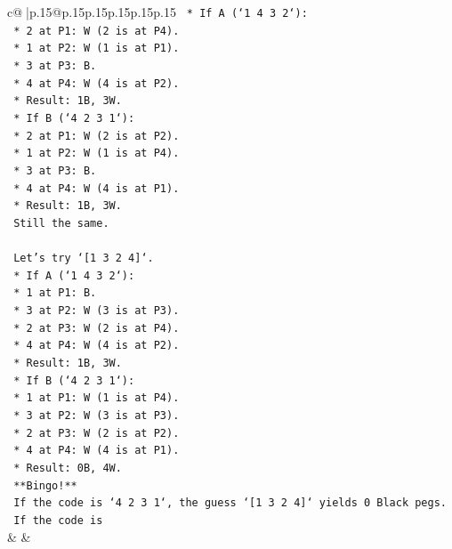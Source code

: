 \documentclass{article}
\begin{document}
{\begin{supertabular}{c@{$\;$}|p{.15\linewidth}@{}p{.15\linewidth}p{.15\linewidth}p{.15\linewidth}p{.15\linewidth}p{.15\linewidth}}
{{{\texttt{    *   If A (`1 4 3 2`):} \\
\texttt{        *   2 at P1: W (2 is at P4).} \\
\texttt{        *   1 at P2: W (1 is at P1).} \\
\texttt{        *   3 at P3: B.} \\
\texttt{        *   4 at P4: W (4 is at P2).} \\
\texttt{        *   Result: 1B, 3W.} \\
\texttt{    *   If B (`4 2 3 1`):} \\
\texttt{        *   2 at P1: W (2 is at P2).} \\
\texttt{        *   1 at P2: W (1 is at P4).} \\
\texttt{        *   3 at P3: B.} \\
\texttt{        *   4 at P4: W (4 is at P1).} \\
\texttt{        *   Result: 1B, 3W.} \\
\texttt{    Still the same.} \\
\\ 
\texttt{    Let's try `{[}1 3 2 4{]}`.} \\
\texttt{    *   If A (`1 4 3 2`):} \\
\texttt{        *   1 at P1: B.} \\
\texttt{        *   3 at P2: W (3 is at P3).} \\
\texttt{        *   2 at P3: W (2 is at P4).} \\
\texttt{        *   4 at P4: W (4 is at P2).} \\
\texttt{        *   Result: 1B, 3W.} \\
\texttt{    *   If B (`4 2 3 1`):} \\
\texttt{        *   1 at P1: W (1 is at P4).} \\
\texttt{        *   3 at P2: W (3 is at P3).} \\
\texttt{        *   2 at P3: W (2 is at P2).} \\
\texttt{        *   4 at P4: W (4 is at P1).} \\
\texttt{        *   Result: 0B, 4W.} \\
\texttt{    **Bingo!**} \\
\texttt{    If the code is `4 2 3 1`, the guess `{[}1 3 2 4{]}` yields 0 Black pegs.} \\
\texttt{    If the code is} \\
            }
        }
    }
    & & \\ \\


\end{supertabular}}
\end{document}
